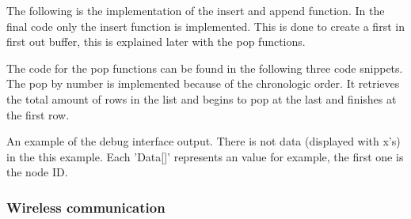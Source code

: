 \documentclass[10pt,a4paper]{article}
\begin{document}
The following is the implementation of the insert and append function. In the final code only the insert function is implemented. This is done to create a first in first out buffer, this is explained later with the pop functions.





The code for the pop functions can be found in the following three code snippets. The pop by number is implemented because of the chronologic order. It retrieves the total amount of rows in the list and begins to pop at the last and finishes at the first row.







An example of the debug interface output. There is not data (displayed with x's) in the this example. Each 'Data[]' represents an value for example, the first one is the node ID.




\subsubsection{Wireless communication}
\end{document}
